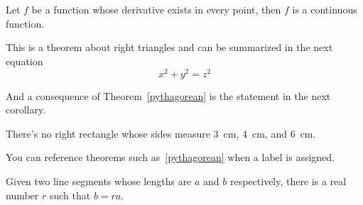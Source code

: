 \section{}
%
\begin{theorem}
	Let \(f\) be a function whose derivative exists in every point, then \(f\) is 
	a continuous function.
\end{theorem}
%
\begin{theorem}\label{pythagorean}
	This is a theorem about right triangles and can be summarized in the next 
	equation 
	\[ x^2 + y^2 = z^2 \]
\end{theorem}
%
And a consequence of Theorem~\ref{pythagorean} is the statement in the next 
corollary.
%
\begin{corollary}
	There's no right rectangle whose sides measure 3 cm, 4 cm, and 6 cm.
\end{corollary}
%
You can reference theorems such as~\ref{pythagorean} when a label is assigned.
%
\begin{lemma}
	Given two line segments whose lengths are \(a\) and \(b\) respectively, there is a 
	real number \(r\) such that \(b=ra\).
\end{lemma}
%
